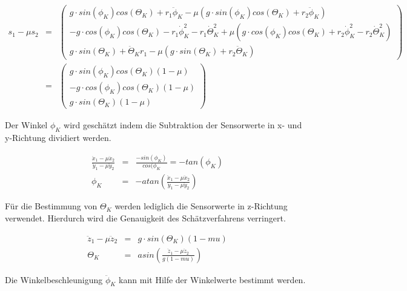 \documentclass{article}
\begin{document}
\begin{equation}
\begin{array}{lcl}
s_1 - \mu s_2 
& = &
\begin{pmatrix}
g \cdot sin(\phi_K)cos(\Theta_K) + r_1 \ddot{\phi}_K - \mu(g \cdot sin(\phi_K)cos(\Theta_K) + r_2 \ddot{\phi}_K) \\
-g \cdot cos(\phi_K)cos(\Theta_K) - r_1 \dot{\phi}^2_K - r_1 \dot{\Theta}^2_K + \mu (g \cdot cos(\phi_K) cos(\Theta_K) + r_2 \dot{\phi}^2_K - r_2 \dot{\Theta}^2_K)\\
g \cdot sin(\Theta_K) + \ddot{\Theta}_K r_1 - \mu(g \cdot sin(\Theta_K) + r_2 \ddot{\Theta}_K)
\end{pmatrix} 
\\
& = &
\begin{pmatrix}
g \cdot sin(\phi_K)cos(\Theta_K)(1 - \mu) \\
- g \cdot cos(\phi_K)cos(\Theta_K)(1 - \mu) \\
g \cdot sin(\Theta_K)(1 - \mu)
\end{pmatrix}
\end{array}
\end{equation}

Der Winkel $\phi_K$ wird geschätzt indem die Subtraktion der Sensorwerte in x- und y-Richtung dividiert werden.

\begin{equation}
\begin{array}{lcl}
\frac{\ddot{x}_1 - \mu \ddot{x}_2}{\ddot{y}_1 - \mu \ddot{y}_2}
& = &
\frac{- sin(\phi_K)}{cos(\phi_K} = -tan(\phi_K) \\
\phi_K
& = &
-atan(\frac{\ddot{x}_1 - \mu \ddot{x}_2}{\ddot{y}_1 - \mu \ddot{y}_2})
\end{array}
\end{equation}



Für die Bestimmung von $\Theta_K$ werden lediglich die Sensorwerte in z-Richtung verwendet. Hierdurch wird die Genauigkeit des Schätzverfahrens verringert.

\begin{equation}
\begin{array}{lcl}
\ddot{z}_1 - \mu \ddot{z}_2 
& = &
g \cdot sin(\Theta_K)(1 - mu) \\
\Theta_K
& = &
asin(\frac{\ddot{z}_1 - \mu \ddot{z}_2}{g(1 - mu)})
\end{array}
\end{equation}

Die Winkelbeschleunigung $\ddot{\phi}_K$ kann mit Hilfe der Winkelwerte bestimmt werden.
\end{document}
